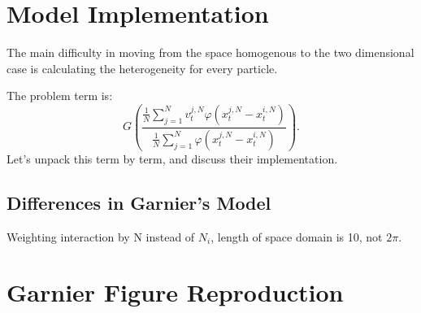 \documentclass[11pt,a4paper]{article}
\begin{document}
    \section{Model Implementation}
        The main difficulty in moving from the space homogenous to the two dimensional case is calculating the heterogeneity for every particle.
        
        The problem term is:
        \[
            G\left(\frac{\frac{1}{N}\sum_{j=1}^N v_t^{j,N}\varphi(x^{j,N}_t-x^{i,N}_t)}{\frac{1}{N}\sum_{j=1}^N \varphi(x^{j,N}_t-x^{i,N}_t)}\right).
        \]
        Let's unpack this term by term, and discuss their implementation.
        \subsection{Differences in Garnier's Model}
            Weighting interaction by N instead of $N_i$, length of space domain is 10, not $2\pi$.
    \section{Garnier Figure Reproduction}
\end{document}
